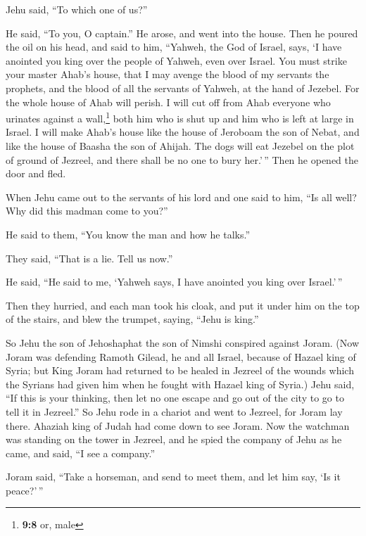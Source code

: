 Jehu said, ``To which one of us?''

He said, ``To you, O captain.''  He arose, and went into
the house. Then he poured the oil on his head, and said to him,
``Yahweh, the God of Israel, says, `I have anointed you king over the
people of Yahweh, even over Israel.  You must strike your
master Ahab's house, that I may avenge the blood of my servants the
prophets, and the blood of all the servants of Yahweh, at the hand of
Jezebel.  For the whole house of Ahab will perish. I will
cut off from Ahab everyone who urinates against a wall,\footnote{\textbf{9:8}
  or, male} both him who is shut up and him who is left at large in
Israel.  I will make Ahab's house like the house of
Jeroboam the son of Nebat, and like the house of Baasha the son of
Ahijah.  The dogs will eat Jezebel on the plot of ground
of Jezreel, and there shall be no one to bury her.'\,'' Then he opened
the door and fled.

 When Jehu came out to the servants of his lord and one
said to him, ``Is all well? Why did this madman come to you?''

He said to them, ``You know the man and how he talks.''

 They said, ``That is a lie. Tell us now.''

He said, ``He said to me, `Yahweh says, I have anointed you king over
Israel.'\,''

 Then they hurried, and each man took his cloak, and put
it under him on the top of the stairs, and blew the trumpet, saying,
``Jehu is king.''

 So Jehu the son of Jehoshaphat the son of Nimshi
conspired against Joram. (Now Joram was defending Ramoth Gilead, he and
all Israel, because of Hazael king of Syria;  but King
Joram had returned to be healed in Jezreel of the wounds which the
Syrians had given him when he fought with Hazael king of Syria.) Jehu
said, ``If this is your thinking, then let no one escape and go out of
the city to go to tell it in Jezreel.''  So Jehu rode in
a chariot and went to Jezreel, for Joram lay there. Ahaziah king of
Judah had come down to see Joram.  Now the watchman was
standing on the tower in Jezreel, and he spied the company of Jehu as he
came, and said, ``I see a company.''

Joram said, ``Take a horseman, and send to meet them, and let him say,
`Is it peace?'\,''

